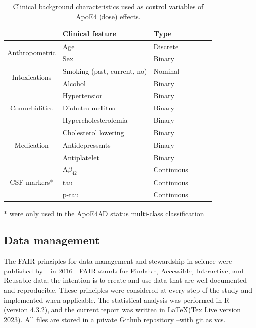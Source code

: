 \documentclass{amsart}
\begin{document}
\begin{table}[htb]
\caption{Clinical background characteristics used as control variables of ApoE4 (dose) effects.}
\label{tab:clin}
\begin{threeparttable}
\begin{tabular}{clllll} \toprule
                                & \textbf{Clinical feature}   & \textbf{Type} \\ \midrule
\multirow{2}{*}{Anthropometric} & Age                         & Discrete      \\
                                & Sex                         & Binary        \\
\multirow{2}{*}{Intoxications}  & Smoking (past, current, no) & Nominal       \\
                                & Alcohol                     & Binary        \\
\multirow{3}{*}{Comorbidities}  & Hypertension                & Binary        \\
                                & Diabetes mellitus           & Binary        \\
                                & Hypercholesterolemia        & Binary        \\
\multirow{3}{*}{Medication}     & Cholesterol lowering        & Binary       \\
                                & Antidepressants             & Binary        \\
                                & Antiplatelet                & Binary        \\ 
\multirow{3}{*}{CSF markers$\ast$}    & A$\beta_{42}$               & Continuous       \\
                                & tau                         & Continuous       \\
                                & p-tau                       & Continuous       \\\bottomrule
\end{tabular}
\begin{tablenotes}
  \item[$\ast$] were only used in the ApoE4AD status multi-class classification
\end{tablenotes}
\end{threeparttable}
\end{table}

\subsection{Data management}\label{datamanagement}
The FAIR principles for data management and stewardship in science were published by  ~\citeauthor{Wilkinson2016TheStewardship} in 2016 \cite{Wilkinson2016TheStewardship}. FAIR stands for Findable, Accessible, Interactive, and Reusable data; the intention is to create and use data that are well-documented and reproducible. These principles were considered at every step of the study and implemented when applicable. The statistical analysis was performed in R (version 4.3.2), and the current report was written in \LaTeX  (Tex Live version 2023). All files are stored in a private Github repository --with git as \acrfull{vcs}.
\end{document}

